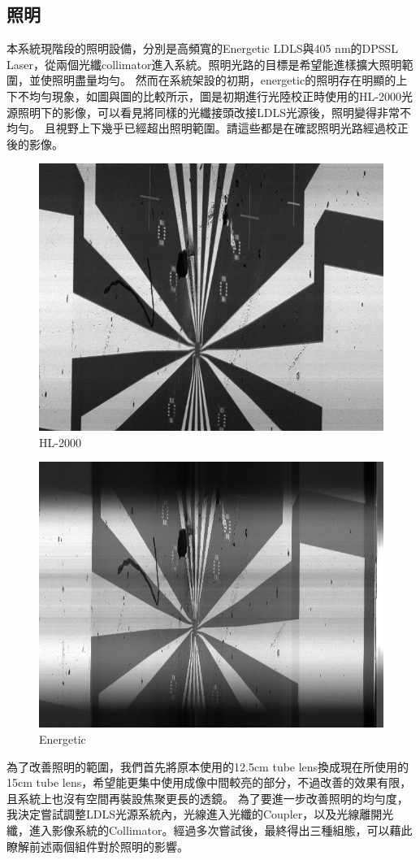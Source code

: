 \documentclass[12pt]{article}
\begin{document}
\subsection{照明}
本系統現階段的照明設備，分別是高頻寬的Energetic LDLS與405 nm的DPSSL Laser，從兩個光纖collimator進入系統。照明光路的目標是希望能進樣擴大照明範圍，並使照明盡量均勻。
然而在系統架設的初期，energetic的照明存在明顯的上下不均勻現象，如圖與圖的比較所示，圖是初期進行光陸校正時使用的HL-2000光源照明下的影像，可以看見將同樣的光纖接頭改接LDLS光源後，照明變得非常不均勻。
且視野上下幾乎已經超出照明範圍。請這些都是在確認照明光路經過校正後的影像。
\begin{figure}
    \centering
    \includegraphics[width=0.5\linewidth]{0831focusForOmFullScanHL2000Scaled.jpg}
    \caption{HL-2000}
\end{figure}
\begin{figure}
    \centering
    \includegraphics[width=0.5\linewidth]{0909Energetic.jpg}
    \caption{Energetic}
\end{figure}
為了改善照明的範圍，我們首先將原本使用的12.5cm tube lens換成現在所使用的15cm tube lens，希望能更集中使用成像中間較亮的部分，不過改善的效果有限，且系統上也沒有空間再裝設焦聚更長的透鏡。
為了要進一步改善照明的均勻度，我決定嘗試調整LDLS光源系統內，光線進入光纖的Coupler，以及光線離開光纖，進入影像系統的Collimator。經過多次嘗試後，最終得出三種組態，可以藉此瞭解前述兩個組件對於照明的影響。
\end{document}
